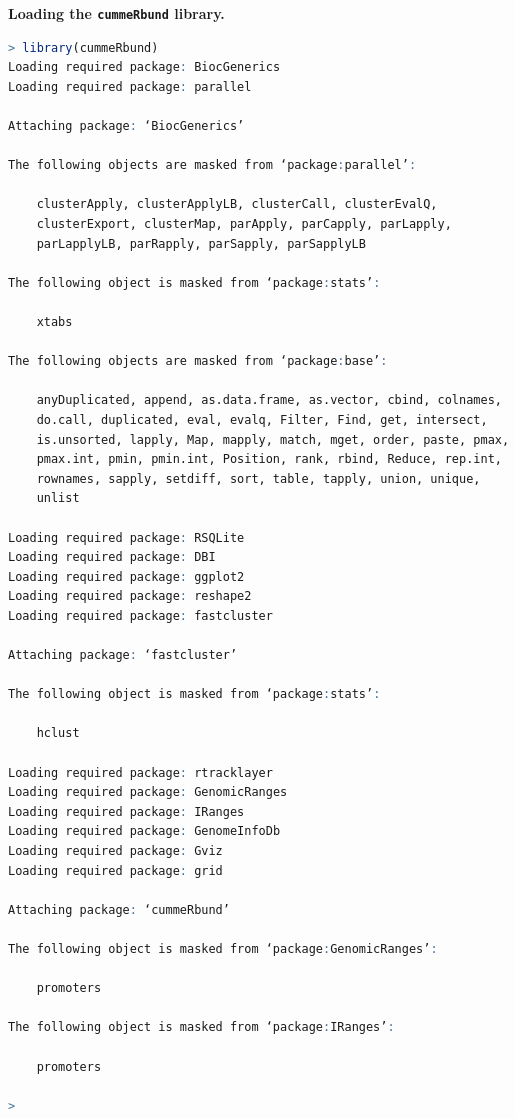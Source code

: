 \documentclass[a4paper,10pt]{article}
\begin{document}
\pagebreak
\noindent\textbf{Loading the \texttt{\footnotesize{cummeRbund}} library.}\\
\begin{lstlisting}[language=R]
> library(cummeRbund)
Loading required package: BiocGenerics
Loading required package: parallel

Attaching package: ‘BiocGenerics’

The following objects are masked from ‘package:parallel’:

    clusterApply, clusterApplyLB, clusterCall, clusterEvalQ,
    clusterExport, clusterMap, parApply, parCapply, parLapply,
    parLapplyLB, parRapply, parSapply, parSapplyLB

The following object is masked from ‘package:stats’:

    xtabs

The following objects are masked from ‘package:base’:

    anyDuplicated, append, as.data.frame, as.vector, cbind, colnames,
    do.call, duplicated, eval, evalq, Filter, Find, get, intersect,
    is.unsorted, lapply, Map, mapply, match, mget, order, paste, pmax,
    pmax.int, pmin, pmin.int, Position, rank, rbind, Reduce, rep.int,
    rownames, sapply, setdiff, sort, table, tapply, union, unique,
    unlist

Loading required package: RSQLite
Loading required package: DBI
Loading required package: ggplot2
Loading required package: reshape2
Loading required package: fastcluster

Attaching package: ‘fastcluster’

The following object is masked from ‘package:stats’:

    hclust

Loading required package: rtracklayer
Loading required package: GenomicRanges
Loading required package: IRanges
Loading required package: GenomeInfoDb
Loading required package: Gviz
Loading required package: grid

Attaching package: ‘cummeRbund’

The following object is masked from ‘package:GenomicRanges’:

    promoters

The following object is masked from ‘package:IRanges’:

    promoters

> 
\end{lstlisting}
\end{document}
